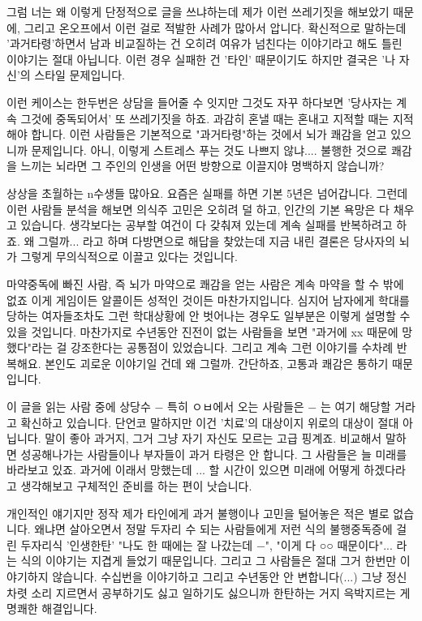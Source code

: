 그럼 너는 왜 이렇게 단정적으로 글을 쓰냐하는데 제가 이런 쓰레기짓을 해보았기 때문에,
그리고 온오프에서 이런 걸로 적발한 사례가 많아서 압니다.
확신적으로 말하는데 '과거타령'하면서 남과 비교질하는 건
오히려 여유가 넘친다는 이야기라고 해도 틀린 이야기는 절대 아닙니다.
이런 경우 실패한 건 '타인' 때문이기도 하지만 결국은 '나 자신'의 스타일 문제입니다.
\vspace{5mm}

이런 케이스는 한두번은 상담을 들어줄 수 잇지만 그것도 자꾸 하다보면
'당사자는 계속 그것에 중독되어서' 또 쓰레기짓을 하죠.
과감히 혼낼 때는 혼내고 지적할 때는 지적해야 합니다.
이런 사람들은 기본적으로 "과거타령"하는 것에서 뇌가 쾌감을 얻고 있으니까 문제입니다.
아니, 이렇게 스트레스 푸는 것도 나쁘지 않냐....
불행한 것으로 쾌감을 느끼는 뇌라면 그 주인의 인생을 어떤 방향으로 이끌지야 명백하지 않습니까?
\vspace{5mm}

상상을 초월하는 n수생들 많아요. 요즘은 실패를 하면 기본 5년은 넘어갑니다.
그런데 이런 사람들 분석을 해보면 의식주 고민은 오히려 덜 하고, 인간의 기본 욕망은 다 채우고 있습니다.
생각보다는 공부할 여건이 다 갖춰져 있는데 계속 실패를 반복하려고 하죠.
왜 그럴까... 라고 하며 다방면으로 해답을 찾았는데
지금 내린 결론은 당사자의 뇌가 그렇게 무의식적으로 이끌고 있다는 것입니다.
\vspace{5mm}

마약중독에 빠진 사람, 즉 뇌가 마약으로 쾌감을 얻는 사람은 계속 마약을 할 수 밖에 없죠
이게 게임이든 알콜이든 성적인 것이든 마찬가지입니다.
심지어 남자에게 학대를 당하는 여자들조차도 그런 학대상황에 안 벗어나는 경우도 일부분은 이렇게 설명할 수 있을 것입니다.
마찬가지로 수년동안 진전이 없는 사람들을 보면 "과거에 xx 때문에 망했다"라는 걸 강조한다는 공통점이 있었습니다.
그리고 계속 그런 이야기를 수차례 반복해요. 본인도 괴로운 이야기일 건데 왜 그럴까.
간단하죠, 고통과 쾌감은 통하기 때문입니다.
\vspace{5mm}

이 글을 읽는 사람 중에 상당수 $-$ 특히 ㅇㅂ에서 오는 사람들은 $-$ 는 여기 해당할 거라고 확신하고 있습니다.
단언코 말하지만 이건 '치료'의 대상이지 위로의 대상이 절대 아닙니다. 말이 좋아 과거지, 그거 그냥 자기 자신도 모르는 고급 핑계죠.
비교해서 말하면 성공해나가는 사람들이나 부자들이 과거 타령은 안 합니다. 그 사람들은 늘 미래를 바라보고 있죠.
과거에 이래서 망했는데 ... 할 시간이 있으면 미래에 어떻게 하겠다라고 생각해보고 구체적인 준비를 하는 편이 낫습니다.
\vspace{5mm}

개인적인 얘기지만 정작 제가 타인에게 과거 불행이나 고민을 털어놓은 적은 별로 없습니다.
왜냐면 살아오면서 정말 두자리 수 되는 사람들에게 저런 식의 불행중독증에 걸린 두자리식 '인생한탄'
"나도 한 때에는 잘 나갔는데 $-$", "이게 다 ○○ 때문이다"... 라는 식의 이야기는 지겹게 들었기 때문입니다.
그리고 그 사람들은 절대 그거 한번만 이야기하지 않습니다. 수십번을 이야기하고 그리고 수년동안 안 변합니다(...)
그냥 정신차렷 소리 지르면서 공부하기도 싫고 일하기도 싫으니까 한탄하는 거지 윽박지르는 게 명쾌한 해결입니다.
\vspace{5mm}










